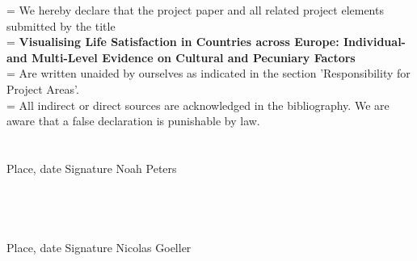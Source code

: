 \documentclass[preprint,12pt,authoryear]{elsarticle}
\begin{document}
	\hangindent=\parindent
	\parindent 0pt
	We hereby declare that the project paper and all related project elements submitted by the title 
	\\
	
	\hangindent=\parindent
	\parindent 0pt
	\textbf{Visualising Life Satisfaction in Countries across Europe: Individual- and Multi-Level Evidence on Cultural and Pecuniary Factors} 
	\\
	
	\hangindent=\parindent
	\parindent 0pt
	Are written unaided by ourselves as indicated in the section 'Responsibility for Project Areas'. 
	\\
	
	\hangindent=\parindent
	\parindent 0pt
	All indirect or direct sources are acknowledged in the bibliography. We are aware that a false declaration is punishable by law. 
	\\
	\\
	\\
	Place, date                                         	Signature Noah Peters
	\\
	\\
	\\
	\\
	\\
	Place, date												Signature Nicolas Goeller
	
	
	
	
\end{document}
